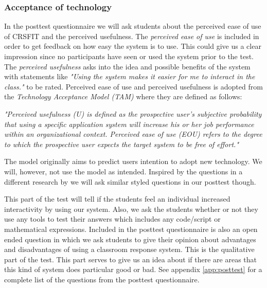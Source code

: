 \subsubsection*{Acceptance of technology}
In the posttest questionnaire we will ask students about the perceived ease of use of CRSFIT and the perceived usefulness. The \emph{perceived ease of use} is included in order to get feedback on how easy the system is to use. This could give us a clear impression since no participants have seen or used the system prior to the test. The \emph{perceived usefulness} asks into the idea and possible benefits of the system with statements like \emph{"Using the system makes it easier for me to interact in the class."} to be rated. Perceived ease of use and perceived usefulness is adopted from the \emph{Technology Acceptance Model (TAM)} \cite{siau2006use,davis1989user} where they are defined as follows:

\emph{"Perceived usefulness (U) is defined as the prospective user's subjective probability that using a specific application system will increase his or her job performance within an organizational context. Perceived ease of use (EOU) refers to the degree to which the prospective user expects the target system to be free of effort."} \cite[p.~985]{davis1989user}

The model originally aims to predict users intention to adopt new technology. We will, however, not use the model as intended. Inspired by the questions in a different research by  we will ask similar styled questions in our posttest though.

This part of the test will tell if the students feel an individual increased interactivity by using our system. Also, we ask the students whether or not they use any tools to test their answers which includes any code/script or mathematical expressions. Included in the posttest questionnaire is also an open ended question in which we ask students to give their opinion about advantages and disadvantages of using a classroom response system. This is the qualitative part of the test. This part serves to give us an idea about if there are areas that this kind of system does particular good or bad. See appendix \ref{app:posttest} for a complete list of the questions from the posttest questionnaire. 


